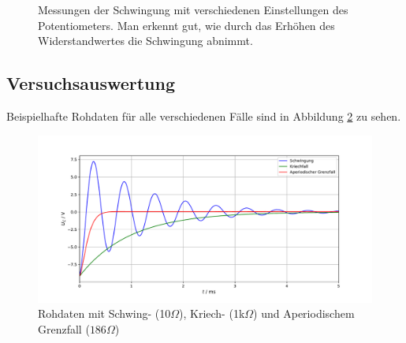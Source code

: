 \documentclass[a4paper, 12pt]{scrartcl}
\begin{document}
\begin{figure}[h]
\centering
{}

\caption{Messungen der Schwingung mit verschiedenen Einstellungen des Potentiometers. Man erkennt gut, wie durch das Erhöhen des Widerstandwertes die Schwingung abnimmt.}
\label{pic:oszi}
\end{figure}

\subsection{Versuchsauswertung}

Beispielhafte Rohdaten für alle verschiedenen Fälle sind in Abbildung \ref{abb:rohdaten_ska} zu sehen.

\begin{figure}[H]
\centering
\includegraphics[width=.9\textwidth]{plots/rohdaten_ska.pdf}
\caption{Rohdaten mit Schwing- (10$\Omega$), Kriech- (1k$\Omega$) und Aperiodischem Grenzfall ($186\Omega$)}
\label{abb:rohdaten_ska}
\end{figure}
\end{document}
